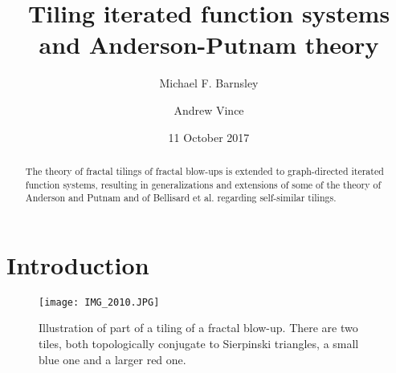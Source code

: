 \documentclass{amsproc}
\theoremstyle{plain}
\theoremstyle{definition}
\numberwithin{equation}{section}
\begin{document}
\title{Tiling iterated function systems and Anderson-Putnam theory}
\author[M. F. Barnsley]{Michael F. Barnsley}
\address{Australian National University\\
Canberra, ACT, Australia }
\author{Andrew Vince}
\address{University of Florida\\
Gainesville, FL, USA \\
}
\date{11 October 2017}

\begin{abstract}
The theory of fractal tilings of fractal blow-ups is extended to
graph-directed iterated function systems, resulting in generalizations and
extensions of some of the theory of Anderson and Putnam and of Bellisard et
al. regarding self-similar tilings.
\end{abstract}

\maketitle

\section{Introduction \label{sec:intro}}

\begin{figure}[ptb]
\centering\texttt{[image: IMG\_2010.JPG]}
\caption{Illustration of part of a tiling of a fractal blow-up. There are
two tiles, both topologically conjugate to Sierpinski triangles, a small
blue one and a larger red one.}
\label{img_2010}
\end{figure}
\end{document}
